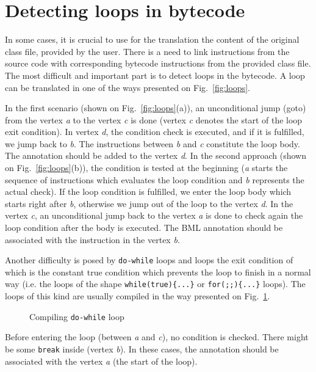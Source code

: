 \documentclass{llncs}
\begin{document}
\section{Detecting loops in bytecode}
\label{sec:loops}

In some cases, it is crucial to use for the translation the content of
the original class file, provided by the user. There is a need to link
instructions from the source code with corresponding bytecode
instructions from the provided class file. The most difficult and
important part is to detect loops in the bytecode. A loop can be translated in one of the ways presented on
Fig.~\ref{fig:loops}.

In the first scenario (shown on Fig.~\ref{fig:loops}(a)), an
unconditional jump (goto) from the vertex \textit{a} to the vertex
\textit{c} is done (vertex \textit{c} denotes the start of the loop
exit condition). In vertex \textit{d}, the condition check is
executed, and if it is fulfilled, we jump back to \textit{b}. The
instructions between \textit{b} and \textit{c} constitute the loop
body. The annotation should be added to the vertex \textit{d}. In the
second approach (shown on Fig.~\ref{fig:loops}(b)), the condition is
tested at the beginning (\textit{a} starts the sequence of
instructions which evaluates the loop condition and \textit{b}
represents the actual check). If the loop condition is fulfilled, we
enter the loop body which starts right after \textit{b}, otherwise we
jump out of the loop to the vertex \textit{d}. In the vertex
\textit{c}, an unconditional jump back to the vertex \textit{a} is
done to check again the loop condition after the body is executed. The
BML annotation should be associated with the instruction in the vertex
\textit{b}.

Another difficulty is posed by \texttt{do-while} loops and loops the
exit condition of which is the constant true condition which prevents
the loop to finish in a normal way (i.e. the loops of the
shape \texttt{while(true)\{...\}}
or \texttt{for(;;)\{...\}} loops). The loops of this kind are usually
compiled in the way presented on Fig.~\ref{fig:dowhile}.

\begin{figure}[ht]
\caption{Compiling \texttt{do-while} loop}
\label{fig:dowhile}
\end{figure}
Before entering the loop (between \textit{a} and \textit{c}), no
condition is checked. There might be some \texttt{break} inside
(vertex \textit{b}).  In these cases, the annotation should be
associated with the vertex \textit{a} (the start of the loop).
\end{document}
